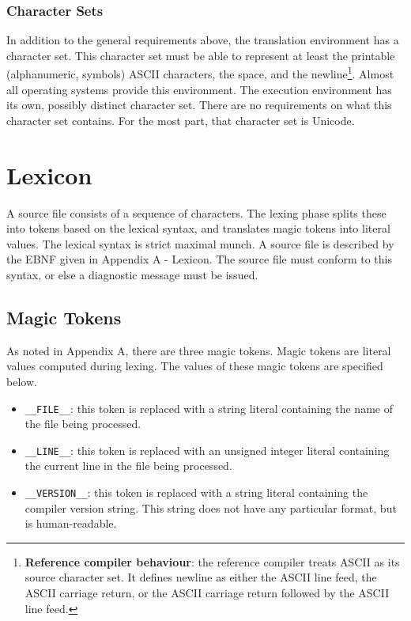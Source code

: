 \documentclass[letterpaper,12pt]{book}
\begin{document}
\subsection{Character Sets}

In addition to the general requirements above, the translation environment has a character set. This character set must be able to represent at least the printable (alphanumeric, symbols) ASCII characters, the space, and the newline\footnote{\textbf{Reference compiler behaviour}: the reference compiler treats ASCII as its source character set. It defines newline as either the ASCII line feed, the ASCII carriage return, or the ASCII carriage return followed by the ASCII line feed.}. Almost all operating systems provide this environment. The execution environment has its own, possibly distinct character set. There are no requirements on what this character set contains. For the most part, that character set is Unicode.

\chapter{Lexicon}

A source file consists of a sequence of characters. The lexing phase splits these into tokens based on the lexical syntax, and translates magic tokens into literal values. The lexical syntax is strict maximal munch. A source file is described by the EBNF given in Appendix A - Lexicon. The source file must conform to this syntax, or else a diagnostic message must be issued.

\section{Magic Tokens}

As noted in Appendix A, there are three magic tokens. Magic tokens are literal values computed during lexing. The values of these magic tokens are specified below.

\begin{itemize}
	\item \texttt{\_\_FILE\_\_}: this token is replaced with a string literal containing the name of the file being processed.
	
	\item \texttt{\_\_LINE\_\_}: this token is replaced with an unsigned integer literal containing the current line in the file being processed.
	
	\item \texttt{\_\_VERSION\_\_}: this token is replaced with a string literal containing the compiler version string. This string does not have any particular format, but is human-readable.
\end{itemize}
\end{document}
